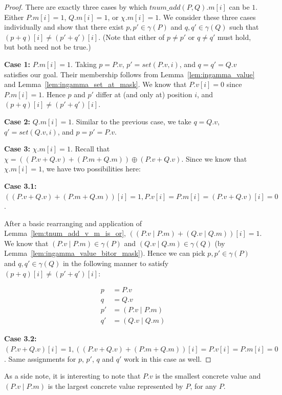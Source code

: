 \documentclass{article}
\newcommand{\Case}[2]{\textbf{Case #1:} #2}
\newcommand{\ith}[1]{#1[i]}
\newcommand{\tv}[1]{#1.v}
\newcommand{\tm}[1]{#1.m}
\newcommand{\ithv}[1]{\ith{\tv{#1}}}
\newcommand{\ithm}[1]{\ith{\tm{#1}}}
\newcommand{\ingamma}[2]{#1 \in \gamma(#2)}
\newcommand{\tadd}[2]{tnum\_add(#1, #2)}
\newcommand{\seti}[1]{set(#1, i)}
\newcommand{\sv}[2]{(\tv{#1} + \tv{#2})}
\newcommand{\sm}[2]{(\tm{#1} + \tm{#2})}
\newcommand{\orvm}[1]{(\tv{#1} \mathbin{|} \tm{#1})}
\begin{document}
\begin{proof}
  There are exactly three cases by which $\ithm{\tadd{P}{Q}}$ can be
  $1$. Either $\ithm{P} = 1$, $\ithm{Q} = 1$, or $\ithm{\chi} = 1$.
  We consider these three cases individually and show that there exist
  $\ingamma{p, p'}{P}$ and $\ingamma{q, q'}{Q}$ such that $\ith{(p +
    q)} \neq \ith{(p' + q')}$. (Note that either of $p \neq p'$ or $q
  \neq q'$ must hold, but both need not be true.)

  \Case{1}{$\ithm{P} = 1$}. Taking $p = \tv{P}$, $p' = \seti{\tv{P}}$,
  and $q = q' = \tv{Q}$ satisfies our goal. Their membership follows
  from Lemma~\ref{lem:ingamma_value} and
  Lemma~\ref{lem:ingamma_set_at_mask}. We know that $\ithv{P} = 0$
  since {$\ithm{P} = 1$}. Hence $p$ and $p'$ differ at (and only at)
  position $i$, and $\ith{(p + q)} \neq \ith{(p' + q')}$.

  \Case{2}{$\ithm{Q} = 1$}. Similar to the previous case, we take $q =
  \tv{Q}$, $q' = \seti{\tv{Q}}$, and $p = p' = \tv{P}$.

  \Case{3}{$\ithm{\chi} = 1$}. Recall that $\chi = (\sv{P}{Q} +
  \sm{P}{Q}) \oplus \sv{P}{Q}$. Since we know that $\ithm{\chi} = 1$,
  we have two possibilities here:

  \Case{3.1}{$\ith{(\sv{P}{Q} + \sm{P}{Q})} = 1, \ithv{P} = \ithm{P} = \ith{\sv{P}{Q}} = 0$}.

  After a basic rearranging and application of
  Lemma~\ref{lem:tnum_add_v_m_is_or}, $\ith{(\orvm{P} + \orvm{Q})} =
  1$. We know that $\ingamma{\orvm{P}}{P}$ and $\ingamma{\orvm{Q}}{Q}$
  (by Lemma~\ref{lem:ingamma_value_bitor_mask}). Hence we can pick
  $\ingamma{p, p'}{P}$ and $\ingamma{q, q'}{Q}$ in the following
  manner to satisfy $\ith{(p + q)} \neq \ith{(p' + q')}$:

  \begin{align*}
    p &= \tv{P} \\
    q &= \tv{Q} \\
    p' &= \orvm{P} \\
    q' &= \orvm{Q}
  \end{align*}

  \Case{3.2}{$\ith{\sv{P}{Q}} = 1, \ith{(\sv{P}{Q} + \sm{P}{Q})} =
    \ithv{P} = \ithm{P} = 0$}. Same assignments for $p$, $p'$, $q$ and
  $q'$ work in this case as well.
\end{proof}

As a side note, it is interesting to note that $\tv{P}$ is the
smallest concrete value and $\orvm{P}$ is the largest concrete value
represented by $P$, for any $P$.
\end{document}
